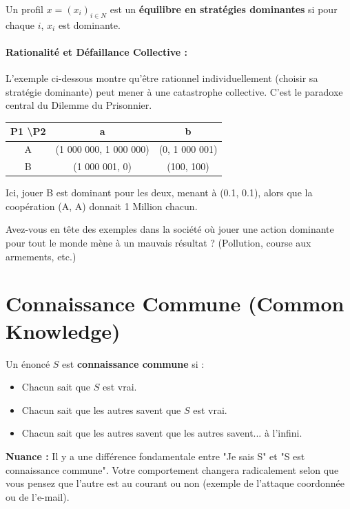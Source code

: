 \begin{definition}
Un profil $x = (x_i)_{i \in N}$ est un \textbf{équilibre en stratégies dominantes} si pour chaque $i$, $x_i$ est dominante.
\end{definition}

\paragraph{Rationalité et Défaillance Collective :}
L'exemple ci-dessous montre qu'être rationnel individuellement (choisir sa stratégie dominante) peut mener à une catastrophe collective. C'est le paradoxe central du Dilemme du Prisonnier.

\begin{center}
\begin{tabular}{c|c|c}
P1 \textbackslash P2 & a & b \\ \hline
A & (1 000 000, 1 000 000) & (0, 1 000 001) \\ \hline
B & (1 000 001, 0) & (100, 100)
\end{tabular}
\end{center}
Ici, jouer B est dominant pour les deux, menant à (0.1, 0.1), alors que la coopération (A, A) donnait 1 Million chacun.

\begin{remarque}[Réflexion]
Avez-vous en tête des exemples dans la société où jouer une action dominante pour tout le monde mène à un mauvais résultat ? (Pollution, course aux armements, etc.)
\end{remarque}

\section{Connaissance Commune (Common Knowledge)}
\begin{definition}
Un énoncé $S$ est \textbf{connaissance commune} si :
\begin{itemize}
    \item Chacun sait que $S$ est vrai.
    \item Chacun sait que les autres savent que $S$ est vrai.
    \item Chacun sait que les autres savent que les autres savent... à l'infini.
\end{itemize}
\end{definition}
\textbf{Nuance :} Il y a une différence fondamentale entre "Je sais S" et "S est connaissance commune". Votre comportement changera radicalement selon que vous pensez que l'autre est au courant ou non (exemple de l'attaque coordonnée ou de l'e-mail).


